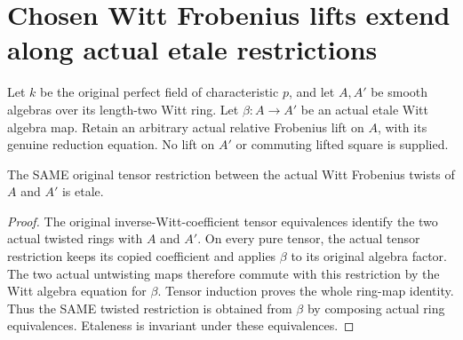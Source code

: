 \section{Chosen Witt Frobenius lifts extend along actual etale restrictions}
\label{sec:witt-two-etale-lift-restriction}

Let $k$ be the original perfect field of characteristic $p$, and let
$A,A'$ be smooth algebras over its length-two Witt ring. Let
$\beta:A\to A'$ be an actual etale Witt algebra map. Retain an
arbitrary actual relative Frobenius lift on $A$, with its genuine
reduction equation. No lift on $A'$ or commuting lifted square is
supplied.

\begin{lemma}
\label{lem:witt-two-twisted-restriction-etale}
\leanok
The SAME original tensor restriction between the actual Witt
Frobenius twists of $A$ and $A'$ is etale.
\end{lemma}
\begin{proof}
The original inverse-Witt-coefficient tensor equivalences identify
the two actual twisted rings with $A$ and $A'$. On every pure
tensor, the actual tensor restriction keeps its copied coefficient
and applies $\beta$ to its original algebra factor. The two actual
untwisting maps therefore commute with this restriction by the
Witt algebra equation for $\beta$. Tensor induction proves the
whole ring-map identity. Thus the SAME twisted restriction is
obtained from $\beta$ by composing actual ring equivalences.
Etaleness is invariant under these equivalences.
\end{proof}

